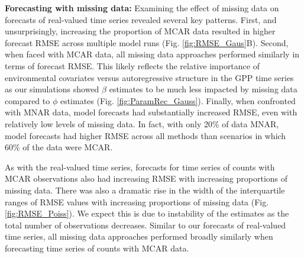 \documentclass[12pt,english]{article} %
\begin{document}
\begin{linenumbers}
\begin{spacing}{1.9}
\begin{flushleft}
\textbf{Forecasting with missing data:} Examining the effect of missing data on forecasts of real-valued time series revealed several key patterns. First, and unsurprisingly, increasing the proportion of MCAR data resulted in higher forecast RMSE across multiple model runs (Fig. \ref{fig:RMSE_Gaus}B). Second, when faced with MCAR data, all missing data approaches performed similarly in terms of forecast RMSE. This likely reflects the relative importance of environmental covariates versus autoregressive structure in the GPP time series as our simulations showed $\beta$ estimates to be much less impacted by missing data compared to $\phi$ estimates (Fig. \ref{fig:ParamRec_Gauss}). Finally, when confronted with MNAR data, model forecasts had substantially increased RMSE, even with relatively low levels of missing data. In fact, with only 20\% of data MNAR, model forecasts had higher RMSE across all methods than scenarios in which 60\% of the data were MCAR.

\hspace{1em} As with the real-valued time series, forecasts for time series of counts with MCAR observations also had increasing RMSE with increasing proportions of missing data. There was also a dramatic rise in the width of the interquartile ranges of RMSE values with increasing proportions of missing data (Fig. \ref{fig:RMSE_Poiss}). We expect this is due to instability of the estimates as the total number of observations decreases. Similar to our forecasts of real-valued time series, all missing data approaches performed broadly similarly when forecasting time series of counts with MCAR data.

\vspace{-2.5em}

\end{flushleft}
\end{spacing}
\end{linenumbers}
\end{document}
